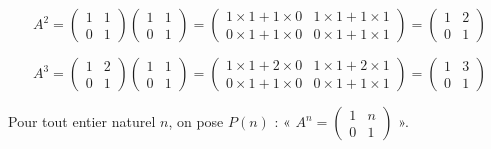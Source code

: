 \documentclass[11pt,fleqn]{book} %
\begin{document}
\begin{solution}\[A^2 =  \begin{pmatrix}1 & 1 \\0 & 1 \end{pmatrix}\begin{pmatrix}1 & 1 \\0 & 1 \end{pmatrix} = \begin{pmatrix} 1 \times 1 + 1 \times 0 & 1 \times 1 + 1 \times 1 \\ 0 \times 1 + 1 \times 0 & 0 \times 1 + 1 \times 1\end{pmatrix} = \begin{pmatrix}1&2 \\ 0& 1\end{pmatrix}\]

\[A^3 =  \begin{pmatrix}1 & 2 \\0 & 1 \end{pmatrix}\begin{pmatrix}1 & 1 \\0 & 1 \end{pmatrix} = \begin{pmatrix} 1 \times 1 + 2 \times 0 & 1 \times 1 + 2 \times 1 \\ 0 \times 1 + 1 \times 0 & 0 \times 1 + 1 \times 1\end{pmatrix} =\begin{pmatrix}1&3 \\ 0& 1\end{pmatrix}\]

Pour tout entier naturel \(n\), on pose \(P(n)\) : « \(A^n = \begin{pmatrix} 1 & n \\ 0 & 1\end{pmatrix}\) ».


\end{solution}
\end{document}
